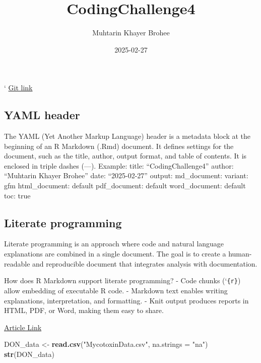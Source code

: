 \documentclass[
]{article}
\title{CodingChallenge4}
\author{Muhtarin Khayer Brohee}
\date{2025-02-27}
\newenvironment{Shaded}{\begin{snugshade}}{\end{snugshade}}
\newcommand{\AttributeTok}[1]{\textcolor[rgb]{0.13,0.29,0.53}{#1}}
\newcommand{\FunctionTok}[1]{\textcolor[rgb]{0.13,0.29,0.53}{\textbf{#1}}}
\newcommand{\NormalTok}[1]{#1}
\newcommand{\OtherTok}[1]{\textcolor[rgb]{0.56,0.35,0.01}{#1}}
\newcommand{\StringTok}[1]{\textcolor[rgb]{0.31,0.60,0.02}{#1}}
\begin{document}
\maketitle

{
\setcounter{tocdepth}{3}
\tableofcontents
}
`
\href{https://github.com/mzb0226/PLPA-6820/blob/main/Coding\%20Challenge4/Challagne4.md}{Git
link}

\subsection{\texorpdfstring{\textbf{YAML
header}}{YAML header}}\label{yaml-header}

The YAML (Yet Another Markup Language) header is a metadata block at the
beginning of an R Markdown (.Rmd) document. It defines settings for the
document, such as the title, author, output format, and table of
contents. It is enclosed in triple dashes (---). Example: title:
``CodingChallenge4'' author: ``Muhtarin Khayer Brohee'' date:
``2025-02-27'' output: md\_document: variant: gfm html\_document:
default pdf\_document: default word\_document: default toc: true

\subsection{\texorpdfstring{\textbf{Literate
programming}}{Literate programming}}\label{literate-programming}

Literate programming is an approach where code and natural language
explanations are combined in a single document. The goal is to create a
human-readable and reproducible document that integrates analysis with
documentation.

How does R Markdown support literate programming? - Code chunks
(`\texttt{\{r\}}) allow embedding of executable R code. - Markdown text
enables writing explanations, interpretation, and formatting. - Knit
output produces reports in HTML, PDF, or Word, making them easy to
share.

\href{https://pubmed.ncbi.nlm.nih.gov/34587775/}{Article Link}

\begin{Shaded}
\begin{Highlighting}[]
\NormalTok{DON\_data }\OtherTok{\textless{}{-}} \FunctionTok{read.csv}\NormalTok{(}\StringTok{"MycotoxinData.csv"}\NormalTok{, }\AttributeTok{na.strings =} \StringTok{"na"}\NormalTok{)}
\FunctionTok{str}\NormalTok{(DON\_data)}
\end{Highlighting}
\end{Shaded}
\end{document}
